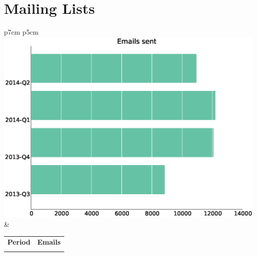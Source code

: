 \documentclass[a4wide,11pt]{report}
\begin{document}
\section{Mailing Lists}

\begin{tabular}{p{7cm} p{5cm}}
    \vspace{0pt} 
    \includegraphics[scale=.35]{figs/emails.eps}
    & 
    \vspace{0pt}
    \begin{tabular}{l|l}%
    \bfseries Period & \bfseries Emails %
    \csvreader[head to column names]{data/emails.csv}{}%
    {\\ & \emails}
    \end{tabular}
\end{tabular}
\end{document}
